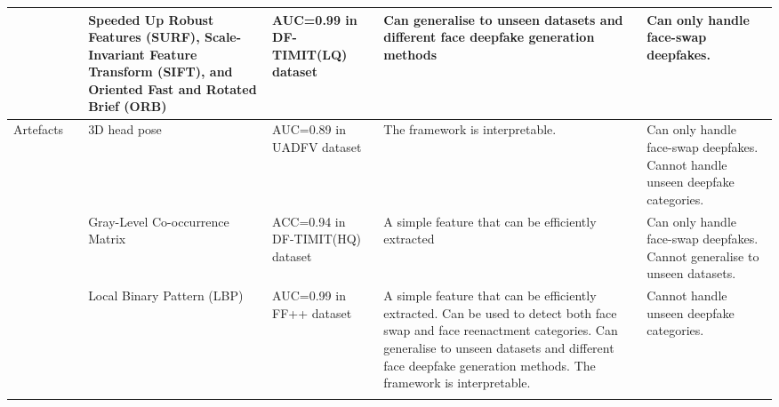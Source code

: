 \begin{table*}[htbp]
{\begin{tabular}{|p{2cm}|p{1cm}|p{5cm}|p{3cm}|p{5cm}|p{5cm}|}
                                   & \cite{wang2022ffr_fd}              & Speeded Up Robust Features (SURF), Scale-Invariant Feature Transform (SIFT), and Oriented Fast and Rotated Brief (ORB) & AUC=0.99 in DF-TIMIT(LQ) dataset \cite{korshunov2018deepfakes}                   & Can generalise to unseen datasets and different face deepfake generation methods                                                                                                                                                            & Can only handle face-swap deepfakes.                                                                  \\ \hline
\multirow{9}{*}{Artefacts}         & \cite{yang2019exposing}             & 3D head pose                                                                                                           & AUC=0.89 in UADFV dataset \cite{xie2020deepfake}                          & The framework is interpretable.                                                                                                                                                                                                             & Can only handle face-swap deepfakes. Cannot handle unseen deepfake categories.                        \\ \cline{2-6} 
                                   & \cite{xu2021deepfake}               & Gray-Level Co-occurrence Matrix                                                                                        & ACC=0.94 in DF-TIMIT(HQ) dataset \cite{korshunov2018deepfakes}                   & A simple feature that can be efficiently extracted                                                                                                                                                                                          & Can only handle face-swap deepfakes. Cannot generalise to unseen datasets.                            \\ \cline{2-6} 
                                   & \cite{kingra2022lbpnet}             & Local Binary Pattern (LBP)                                                                                             & AUC=0.99 in FF++ \cite{rossler2019faceforensics++} dataset                           & A simple feature that can be efficiently extracted. Can be used to detect both face swap and face reenactment categories. Can generalise to unseen datasets and different face deepfake generation methods. The framework is interpretable. & Cannot handle unseen deepfake categories.                                                             \\ \cline{2-6} 

\end{tabular}}
\end{table*}
